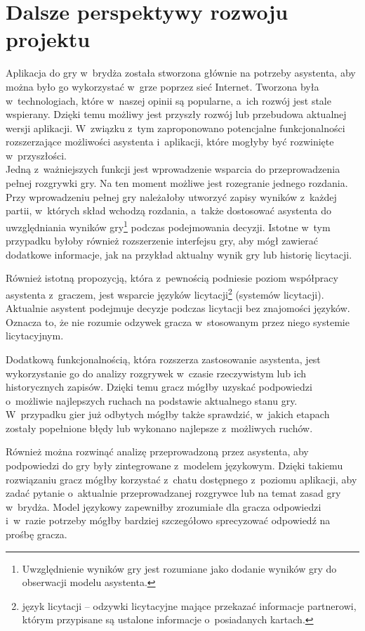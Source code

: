 \FloatBarrier

\section{Dalsze perspektywy rozwoju projektu}

Aplikacja do gry w~brydża została stworzona głównie
na potrzeby asystenta, aby można było go wykorzystać w~grze
poprzez sieć Internet. Tworzona była w~technologiach, które
w~naszej opinii są popularne, a~ich rozwój jest stale wspierany.
Dzięki temu możliwy jest przyszły rozwój lub przebudowa aktualnej
wersji aplikacji.
W~związku z~tym zaproponowano potencjalne funkcjonalności rozszerzające
możliwości asystenta i~aplikacji, które
mogłyby być rozwinięte w~przyszłości. \\

Jedną z~ważniejszych funkcji jest wprowadzenie wsparcia do
przeprowadzenia pełnej rozgrywki gry. Na ten moment możliwe jest
rozegranie jednego rozdania. Przy wprowadzeniu pełnej gry należałoby
utworzyć zapisy wyników z~każdej partii, w~których skład wchodzą rozdania,
a~także dostosować asystenta
do uwzględniania wyników gry\footnote{Uwzględnienie wyników gry jest
  rozumiane jako dodanie wyników gry do obserwacji modelu asystenta.}
podczas podejmowania decyzji. Istotne w~tym przypadku
byłoby również rozszerzenie interfejsu gry, aby mógł zawierać
dodatkowe informacje, jak na przykład aktualny wynik gry lub
historię licytacji.

Również istotną propozycją, która z~pewnością podniesie poziom
współpracy asystenta z~graczem, jest wsparcie języków licytacji\footnote{
  język licytacji -- odzywki licytacyjne mające przekazać informacje
  partnerowi, którym przypisane
  są ustalone informacje o~posiadanych kartach.
} (systemów licytacji).
Aktualnie asystent podejmuje decyzje podczas licytacji bez znajomości
języków. Oznacza to, że nie rozumie odzywek gracza w~stosowanym przez
niego systemie licytacyjnym.

Dodatkową funkcjonalnością, która rozszerza zastosowanie asystenta, jest
wykorzystanie go do analizy rozgrywek w~czasie rzeczywistym lub
ich historycznych zapisów. Dzięki temu gracz mógłby uzyskać podpowiedzi
o~możliwie najlepszych ruchach na podstawie aktualnego stanu gry.
W~przypadku gier już odbytych mógłby także sprawdzić, w~jakich etapach
zostały popełnione błędy lub wykonano najlepsze z~możliwych ruchów.

Również można rozwinąć analizę przeprowadzoną przez asystenta, aby
podpowiedzi do gry były zintegrowane z~modelem językowym. Dzięki
takiemu rozwiązaniu gracz mógłby korzystać z~chatu dostępnego
z~poziomu aplikacji, aby zadać pytanie o~aktualnie przeprowadzanej
rozgrywce lub na temat zasad gry w~brydża. Model językowy zapewniłby
zrozumiałe dla gracza odpowiedzi i~w~razie potrzeby mógłby bardziej
szczegółowo sprecyzować odpowiedź na prośbę gracza.

